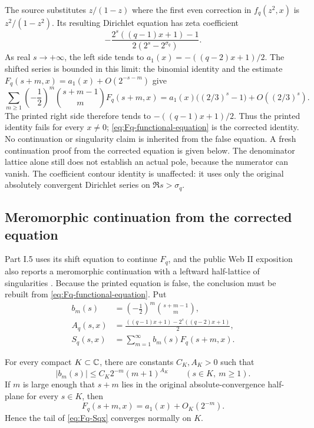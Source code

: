 \begin{sourceissue}
The source substitutes $z/(1-z)$ where the first even correction in
$f_q(z^2,x)$ is $z^2/(1-z^2)$.  Its resulting Dirichlet equation has
zeta coefficient
\[
 -\frac{2^s((q-1)x+1)-1}{2(2^s-2^{\sigma_q})}.
\]
As real $s\to+\infty$, the left side tends to
$a_1(x)=-((q-2)x+1)/2$.  The shifted series is bounded in this limit:
the binomial identity and the estimate
$F_q(s+m,x)=a_1(x)+O(2^{-s-m})$ give
\[
 \sum_{m\geq1}\left(-\frac12\right)^m
 \binom{s+m-1}{m}F_q(s+m,x)
 =a_1(x)\bigl((2/3)^s-1\bigr)+O((2/3)^s).
\]
The printed right side therefore tends to $-((q-1)x+1)/2$.  Thus the
printed identity fails for every $x\ne0$;
\cref{eq:Fq-functional-equation} is the corrected identity.  No
continuation or singularity claim is inherited from the false equation.
A fresh continuation proof from the corrected equation is given below.
The denominator lattice alone still does not establish an actual pole,
because the numerator can vanish.
The coefficient contour identity is unaffected: it uses only the original
absolutely convergent Dirichlet series on $\Re s>\sigma_q$.
\end{sourceissue}

\subsection{Meromorphic continuation from the corrected equation}

Part I.5 uses its shift equation to continue $F_q$, and the public Web II
exposition also reports a meromorphic continuation with a leftward
half-lattice of singularities
\cite{SiegelPartIHalf,SiegelWebII}.  Because the printed equation is false,
the conclusion must be rebuilt from \cref{eq:Fq-functional-equation}.
Put
\begin{align}
 b_m(s)&=\left(-\frac12\right)^m\binom{s+m-1}{m},\label{eq:Fq-bm}\\
 A_q(s,x)&=\frac{((q-1)x+1)-2^s((q-2)x+1)}2,\label{eq:Fq-Aqx}\\
 S_q(s,x)&=\sum_{m=1}^{\infty}b_m(s)F_q(s+m,x).
 \label{eq:Fq-Sqx}
\end{align}

\begin{lemma}
\label{lem:Fq-normal-shifted-tail}
For every compact $K\subset\mathbb C$, there are constants $C_K,A_K>0$ such
that
\[
 |b_m(s)|\leq C_K2^{-m}(m+1)^{A_K}
 \qquad(s\in K,\ m\geq1).
\]
If $m$ is large enough that $s+m$ lies in the original
absolute-convergence half-plane for every $s\in K$, then
\[
 F_q(s+m,x)=a_1(x)+O_K(2^{-m}).
\]
Hence the tail of \cref{eq:Fq-Sqx} converges normally on $K$.
\end{lemma}

